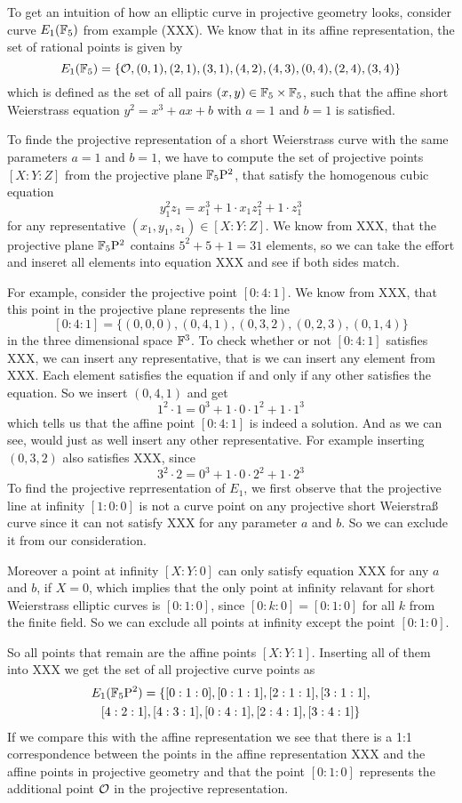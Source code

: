 \begin{example} To get an intuition of how an elliptic curve in projective geometry looks, consider curve $E_1(\mathbb{F}_5)$ from example (XXX). We know that in its affine representation, the set of rational points is given by
$$
E_1(\mathbb{F}_5) = \{\mathcal{O}, (0,1),(2,1),(3,1),(4,2),(4,3),(0,4),(2,4),(3,4)\}
$$
which is defined as the set of all pairs $(x,y)\in \mathbb{F}_5\times \mathbb{F}_5$, such that the affine short Weierstrass equation $y^2 = x^3 + ax +b$ with $a=1$ and $b=1$ is satisfied.

To finde the projective representation of a short Weierstrass curve with the same parameters $a=1$ and $b=1$, we have to compute the set of projective points $[X:Y:Z]$ from the projective plane $\mathbb{F}_5\mathrm{P}^2$, that satisfy the homogenous cubic equation
$$
y_1^2z_1 = x_1^3 + 1\cdot x_1 z_1^2 + 1\cdot z_1^3
$$
for any representative $(x_1,y_1,z_1)\in [X:Y:Z]$. We know from XXX, that the projective plane $\mathbb{F}_5\mathrm{P}^2$ contains $5^2+5+1= 31$ elements, so we can take the effort and inseret all elements into equation XXX and see if both sides match.

For example, consider the projective point $[0:4:1]$. We know from XXX, that this point in the projective plane represents the line
$$
[0:4:1] = \{(0,0,0),(0,4,1),(0,3,2),(0,2,3),(0,1,4)\}
$$
in the three dimensional space $\mathbb{F}^3$. To check whether or not $[0:4:1]$ satisfies XXX, we can insert any representative, that is we can insert any element from XXX. Each element satisfies the equation if and only if any other satisfies the equation. So we insert $(0,4,1)$ and get
$$
1^2\cdot 1 = 0^3 + 1\cdot 0\cdot 1^2 + 1\cdot 1^3
$$
which tells us that the affine point $[0:4:1]$ is indeed a solution. And as we can see, would just as well insert any other representative. For example inserting $(0,3,2)$ also satisfies XXX, since
$$
3^2\cdot 2 = 0^3 + 1\cdot 0\cdot 2^2 + 1\cdot 2^3
$$
To find the projective reprresentation of $E_1$, we first observe that the projective line at infinity $[1:0:0]$ is not a curve point on any projective short Weierstraß curve since it can not satisfy XXX for any parameter $a$ and $b$. So we can exclude it from our consideration.

Moreover a point at infinity $[X:Y:0]$ can only satisfy equation XXX for any $a$ and $b$, if $X=0$, which implies that the only point at infinity relavant for short Weierstrass elliptic curves is $[0:1:0]$, since $[0:k:0]= [0:1:0]$ for all $k$ from the finite field. So we can exclude all points at infinity except the point $[0:1:0]$.

So all points that remain are the affine points $[X:Y:1]$. Inserting all of them into XXX we get the set of all projective curve points as
\begin{multline*}
E_1(\mathbb{F}_5\mathrm{P}^2)=\{[0:1:0], [0:1:1], [2:1:1], [3:1:1], \\ [4:2:1], [4:3:1], [0:4:1], [2:4:1], [3:4:1]\}
\end{multline*}
If we compare this with the affine representation we see that there is a 1:1 correspondence between the points in the affine representation XXX and the affine points in projective geometry and that the point $[0:1:0]$ represents the additional point $\mathcal{O}$ in the projective representation.
\end{example}
